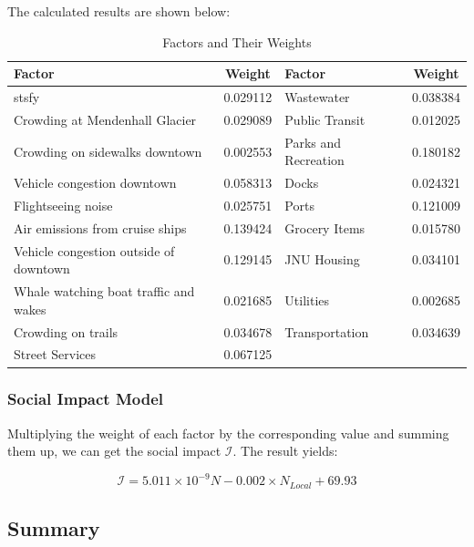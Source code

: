 \vspace{0.5cm}

The calculated results are shown below:

\begin{table}[ht]
    \centering
    \renewcommand{\arraystretch}{1.2}
    \caption{Factors and Their Weights}
    \begin{tabular}{|l|c|l|c|}
    \hline
    \textbf{Factor} & \textbf{Weight} & \textbf{Factor} & \textbf{Weight} \\ \hline
    stsfy & 0.029112 & Wastewater & 0.038384 \\ \hline
    Crowding at Mendenhall Glacier & 0.029089 & Public Transit & 0.012025 \\ \hline
    Crowding on sidewalks downtown & 0.002553 & Parks and Recreation & 0.180182 \\ \hline
    Vehicle congestion downtown & 0.058313 & Docks & 0.024321 \\ \hline
    Flightseeing noise & 0.025751 & Ports & 0.121009 \\ \hline
    Air emissions from cruise ships & 0.139424 & Grocery Items & 0.015780 \\ \hline
    Vehicle congestion outside of downtown & 0.129145 & JNU Housing & 0.034101 \\ \hline
    Whale watching boat traffic and wakes & 0.021685 & Utilities & 0.002685 \\ \hline
    Crowding on trails & 0.034678 & Transportation & 0.034639 \\ \hline
    Street Services & 0.067125 & & \\ \hline
    \end{tabular}
    \end{table}
    
    

\subsubsection{Social Impact Model}

Multiplying the weight of each factor by the corresponding value and summing them up, we can get the social impact $\mathcal{I}$.
The result yields:

\begin{equation}
    \mathcal{I}=5.011\times 10^{-9} N -0.002 \times N_{Local}+69.93
\end{equation}


\subsection{Summary}



